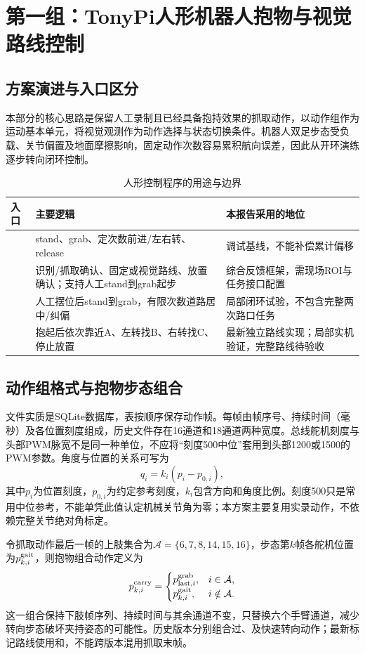 \section{第一组：TonyPi人形机器人抱物与视觉路线控制}
\subsection{方案演进与入口区分}
本部分的核心思路是保留人工录制且已经具备抱持效果的抓取动作，以动作组作为运动基本单元，将视觉观测作为动作选择与状态切换条件。机器人双足步态受负载、关节偏置及地面摩擦影响，固定动作次数容易累积航向误差，因此从开环演练逐步转向闭环控制。
\begin{table}[htbp]\centering\small
\caption{人形控制程序的用途与边界}
\begin{tabularx}{\linewidth}{p{36mm}YY}\toprule
入口 & 主要逻辑 & 本报告采用的地位\\\midrule
{} & stand、grab、定次数前进/左右转、release & 调试基线，不能补偿累计偏移\\
 & 识别/抓取确认、固定或视觉路线、放置确认；支持人工stand到grab起步 & 综合反馈框架，需现场ROI与任务接口配置\\
 & 人工摆位后stand到grab，有限次数道路居中/纠偏 & 局部闭环试验，不包含完整两次路口任务\\
 & 抱起后依次靠近A、左转找B、右转找C、停止放置 & 最新独立路线实现；局部实机验证，完整路线待验收\\\bottomrule
\end{tabularx}\end{table}

\subsection{动作组格式与抱物步态组合}
文件实质是SQLite数据库，表按顺序保存动作帧。每帧由帧序号、持续时间（毫秒）及各位置刻度组成，历史文件存在16通道和18通道两种宽度。总线舵机刻度与头部PWM脉宽不是同一种单位，不应将“刻度500中位”套用到头部1200或1500的PWM参数。角度与位置的关系可写为
\begin{equation}
q_i=k_i(p_i-p_{0,i}),
\end{equation}
其中$p_i$为位置刻度，$p_{0,i}$为约定参考刻度，$k_i$包含方向和角度比例。刻度500只是常用中位参考，不能单凭此值认定机械关节角为零；本方案主要复用实录动作，不依赖完整关节绝对角标定。

令抓取动作最后一帧的上肢集合为$\mathcal A=\{6,7,8,14,15,16\}$，步态第$k$帧各舵机位置为$p_{k,i}^{\rm gait}$，则抱物组合动作定义为
\begin{equation}
p_{k,i}^{\rm carry}=\begin{cases}
p_{{\rm last},i}^{\rm grab},&i\in\mathcal A,\\
p_{k,i}^{\rm gait},&i\notin\mathcal A.
\end{cases}
\end{equation}
这一组合保持下肢帧序列、持续时间与其余通道不变，只替换六个手臂通道，减少转向步态破坏夹持姿态的可能性。历史版本分别组合过、及快速转向动作；最新标记路线使用和，不能跨版本混用抓取末帧。

